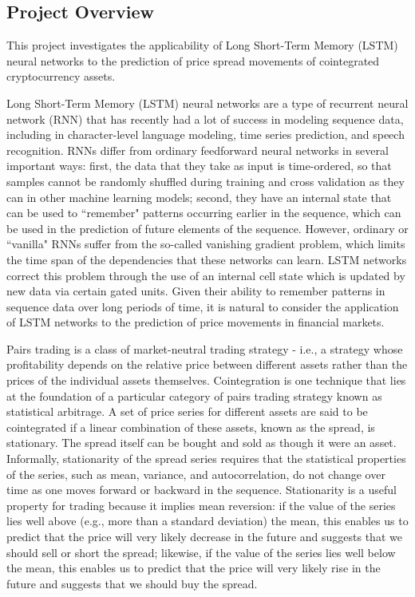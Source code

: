 \documentclass{article}
\begin{document}
\subsection{Project Overview}
 
This project investigates the applicability of Long Short-Term Memory (LSTM) neural networks to the prediction of price spread movements of cointegrated cryptocurrency assets. 

Long Short-Term Memory (LSTM) neural networks are a type of recurrent neural network (RNN) that has recently had a lot of success in modeling sequence data, including in character-level language modeling, time series prediction, and speech recognition. RNNs differ from ordinary feedforward neural networks in several important ways: first, the data that they take as input is time-ordered, so that samples cannot be randomly shuffled during training and cross validation as they can in other machine learning models; second, they have an internal state that can be used to ``remember" patterns occurring earlier in the sequence, which can be used in the prediction of future elements of the sequence. However, ordinary or ``vanilla" RNNs suffer from the so-called vanishing gradient problem, which limits the time span of the dependencies that these networks can learn. LSTM networks correct this problem through the use of an internal cell state which is updated by new data via certain gated units. Given their ability to remember patterns in sequence data over long periods of time, it is natural to consider the application of LSTM networks to the prediction of price movements in financial markets. 

Pairs trading is a class of market-neutral trading strategy - i.e., a strategy whose profitability depends on the relative price between different assets rather than the prices of the individual assets themselves. Cointegration is one technique that lies at the foundation of a particular category of pairs trading strategy known as statistical arbitrage. A set of price series for different assets are said to be cointegrated if a linear combination of these assets, known as the spread, is stationary. The spread itself can be bought and sold as though it were an asset. Informally, stationarity of the spread series requires that the statistical properties of the series, such as mean, variance, and autocorrelation, do not change over time as one moves forward or backward in the sequence. Stationarity is a useful property for trading because it implies mean reversion: if the value of the series lies well above (e.g., more than a standard deviation) the mean, this enables us to predict that the price will very likely decrease in the future and suggests that we should sell or short the spread; likewise, if the value of the series lies well below the mean, this enables us to predict that the price will very likely rise in the future and suggests that we should buy the spread. 
\end{document}
